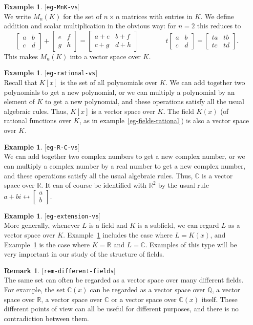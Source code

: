 \documentclass{amsart}
\newcommand{\lbl}[1]{\label{#1}\textup{[\texttt{#1}]}\ \\}
\newcommand{\lbl}{\label}
\newcommand{\Q}         {{\mathbb{Q}}}
\newcommand{\R}         {{\mathbb{R}}}
\newcommand{\C}         {{\mathbb{C}}}
\newcommand{\bsm}       {\left[\begin{smallmatrix}}
\newcommand{\esm}       {\end{smallmatrix}\right]}
\newcommand{\tm}        {\times}
\renewcommand{\:}{\colon}
\theoremstyle{definition}
\newtheorem{remark}[theorem]{Remark}
\newtheorem{example}[theorem]{Example}
\begin{document}
\begin{example}\lbl{eg-MnK-vs}
 We write $M_n(K)$ for the set of $n\tm n$ matrices with entries in
 $K$.  We define addition and scalar multiplication in the
 obvious way: for $n=2$ this reduces to
 \[ \bsm a&b\\ c&d\esm + \bsm e&f\\ g&h\esm = 
     \bsm a+e&b+f \\ c+g & d+h \esm  \hspace{4em}
     t \bsm a&b\\ c&d\esm = \bsm ta&tb\\ tc&td\esm.
 \]
 This makes $M_n(K)$ into a vector space over $K$.
\end{example}

\begin{example}\lbl{eg-rational-vs}
 Recall that $K[x]$ is the set of all polynomials over $K$.  We can
 add together two polynomials to get a new polynomial, or we can
 multiply a polynomial by an element of $K$ to get a new polynomial,
 and these operations satisfy all the usual algebraic rules.  Thus,
 $K[x]$ is a vector space over $K$.  The field $K(x)$ (of rational
 functions over $K$, as in example~\ref{eg-fields-rational}) is also a
 vector space over $K$.
\end{example}

\begin{example}\lbl{eg-R-C-vs}
 We can add together two complex numbers to get a new complex number,
 or we can multiply a complex number by a real number to get a new
 complex number, and these operations satisfy all the usual algebraic
 rules.  Thus, $\C$ is a vector space over $\R$.  It can of course be
 identified with $\R^2$ by the usual rule
 $a+bi\leftrightarrow\bsm a\\ b\esm$.
\end{example}

\begin{example}\lbl{eg-extension-vs}
 More generally, whenever $L$ is a field and $K$ is a subfield, we can
 regard $L$ as a vector space over $K$.  Example~\ref{eg-rational-vs}
 includes the case where $L=K(x)$, and Example~\ref{eg-R-C-vs} is the
 case where $K=\R$ and $L=\C$.  Examples of this type will be very
 important in our study of the structure of fields.
\end{example}

\begin{remark}\lbl{rem-different-fields}
 The same set can often be regarded as a vector space over many
 different fields.  For example, the set $\C(x)$ can be regarded as a
 vector space over $\Q$, a vector space over $\R$, a vector space over
 $\C$ or a vector space over $\C(x)$ itself.  These different points
 of view can all be useful for different purposes, and there is no
 contradiction between them.
\end{remark}
\end{document}
